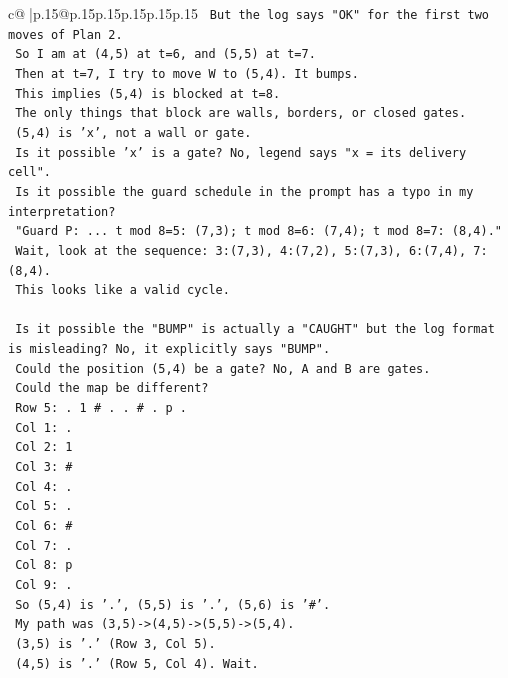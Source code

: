 \documentclass{article}
\begin{document}
{\begin{supertabular}{c@{$\;$}|p{.15\linewidth}@{}p{.15\linewidth}p{.15\linewidth}p{.15\linewidth}p{.15\linewidth}p{.15\linewidth}}
{{{\texttt{  But the log says "OK" for the first two moves of Plan 2.} \\
\texttt{  So I am at (4,5) at t=6, and (5,5) at t=7.} \\
\texttt{  Then at t=7, I try to move W to (5,4). It bumps.} \\
\texttt{  This implies (5,4) is blocked at t=8.} \\
\texttt{  The only things that block are walls, borders, or closed gates.} \\
\texttt{  (5,4) is 'x', not a wall or gate.} \\
\texttt{  Is it possible 'x' is a gate? No, legend says "x = its delivery cell".} \\
\texttt{  Is it possible the guard schedule in the prompt has a typo in my interpretation?} \\
\texttt{  "Guard P: ... t mod 8=5: (7,3); t mod 8=6: (7,4); t mod 8=7: (8,4)."} \\
\texttt{  Wait, look at the sequence: 3:(7,3), 4:(7,2), 5:(7,3), 6:(7,4), 7:(8,4).} \\
\texttt{  This looks like a valid cycle.} \\
\\ 
\texttt{  Is it possible the "BUMP" is actually a "CAUGHT" but the log format is misleading? No, it explicitly says "BUMP".} \\
\texttt{  Could the position (5,4) be a gate? No, A and B are gates.} \\
\texttt{  Could the map be different?} \\
\texttt{  Row 5: . 1 \# . . \# . p .} \\
\texttt{  Col 1: .} \\
\texttt{  Col 2: 1} \\
\texttt{  Col 3: \#} \\
\texttt{  Col 4: .} \\
\texttt{  Col 5: .} \\
\texttt{  Col 6: \#} \\
\texttt{  Col 7: .} \\
\texttt{  Col 8: p} \\
\texttt{  Col 9: .} \\
\texttt{  So (5,4) is '.', (5,5) is '.', (5,6) is '\#'.} \\
\texttt{  My path was (3,5){-}>(4,5){-}>(5,5){-}>(5,4).} \\
\texttt{  (3,5) is '.' (Row 3, Col 5).} \\
\texttt{  (4,5) is '.' (Row 5, Col 4). Wait.} \\
}}}
\end{supertabular}}
\end{document}
